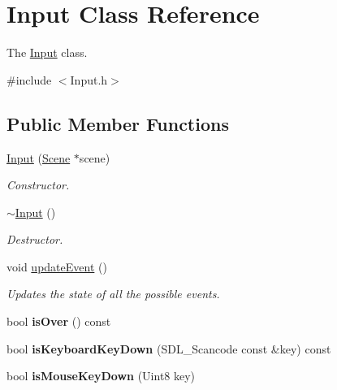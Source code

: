 \hypertarget{classInput}{}\section{Input Class Reference}
\label{classInput}


The \hyperlink{classInput}{Input} class.  




{\ttfamily \#include $<$Input.\+h$>$}

\subsection*{Public Member Functions}
\begin{DoxyCompactItemize}
\item 
\hyperlink{classInput_a41b7906e2eafdf62069e994218838f61}{Input} (\hyperlink{classScene}{Scene} $\ast$scene)
\begin{DoxyCompactList}\small\item\em Constructor. \end{DoxyCompactList}\item 
\hypertarget{classInput_af2db35ba67c8a8ccd23bef6a482fc291}{}\hyperlink{classInput_af2db35ba67c8a8ccd23bef6a482fc291}{$\sim$\+Input} ()\label{classInput_af2db35ba67c8a8ccd23bef6a482fc291}

\begin{DoxyCompactList}\small\item\em Destructor. \end{DoxyCompactList}\item 
void \hyperlink{classInput_a1ad46645cf09f920db19ac848ce0e896}{update\+Event} ()
\begin{DoxyCompactList}\small\item\em Updates the state of all the possible events. \end{DoxyCompactList}\item 
\hypertarget{classInput_a13f33a25d0499886637e16f86e724dc2}{}bool {\bfseries is\+Over} () const \label{classInput_a13f33a25d0499886637e16f86e724dc2}

\item 
\hypertarget{classInput_a4246f4ddfbf7f8128087fdcc502dd134}{}bool {\bfseries is\+Keyboard\+Key\+Down} (S\+D\+L\+\_\+\+Scancode const \&key) const \label{classInput_a4246f4ddfbf7f8128087fdcc502dd134}

\item 
\hypertarget{classInput_a4cec69c66a5f2a62b84bd4011056b748}{}bool {\bfseries is\+Mouse\+Key\+Down} (Uint8 key)\label{classInput_a4cec69c66a5f2a62b84bd4011056b748}


\end{DoxyCompactItemize}
